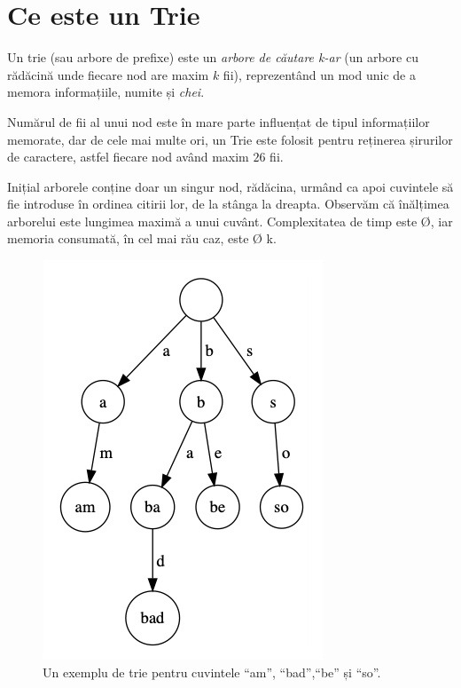 
% 
{}
\section{Ce este un Trie}

Un trie (sau arbore de prefixe) este un \textit{arbore de căutare k-ar} (un arbore cu rădăcină unde fiecare nod are maxim $k$ fii), reprezentând un mod unic de a memora informațiile, numite și \textit{chei}.

Numărul de fii al unui nod este în mare parte influențat de tipul informațiilor memorate, dar de cele mai multe ori, un Trie este folosit pentru reținerea șirurilor de caractere, astfel fiecare nod având maxim $26$ fii.

Inițial arborele conține doar un singur nod, rădăcina, urmând ca apoi cuvintele să fie introduse în ordinea citirii lor, de la stânga la dreapta. 
Observăm că înălțimea arborelui este lungimea maximă a unui cuvânt.
Complexitatea de timp este \O{}, iar memoria consumată, în cel mai rău caz, este \O{ \cdot k}.

\begin{figure}[ht!]
\centering
\includegraphics[width=0.5\linewidth]{images/trie/trie.png}
\caption{\label{fig:frog}Un exemplu de trie pentru cuvintele \enquote{am}, \enquote{bad},\enquote{be} și \enquote{so}.}
\end{figure}

